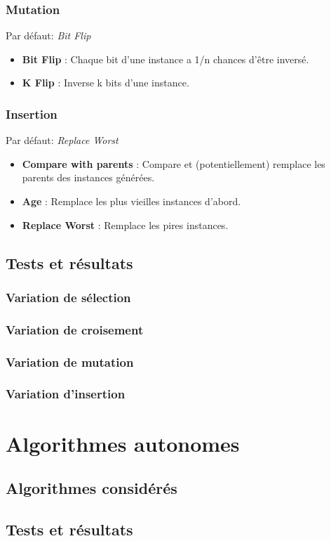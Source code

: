 \documentclass[a4paper,10pt]{report}
\begin{document}
\subsection{Mutation}
Par défaut: \textit{Bit Flip}
\begin{itemize}
   \item \textbf{Bit Flip} : Chaque bit d'une instance a 1/n chances d'être inversé.
   \item \textbf{K Flip} : Inverse k bits d'une instance.
\end{itemize}


\subsection{Insertion}
Par défaut: \textit{Replace Worst}
\begin{itemize}
  \item \textbf{Compare with parents} : Compare et (potentiellement) remplace les parents des instances générées.
  \item \textbf{Age} : Remplace les plus vieilles instances d'abord.
  \item \textbf{Replace Worst} : Remplace les pires instances.
\end{itemize}



\section{Tests et résultats}
\subsection{Variation de sélection}


\subsection{Variation de croisement}


\subsection{Variation de mutation}


\subsection{Variation d'insertion}




\chapter{Algorithmes autonomes}
\section{Algorithmes considérés}


\section{Tests et résultats}
\end{document}
